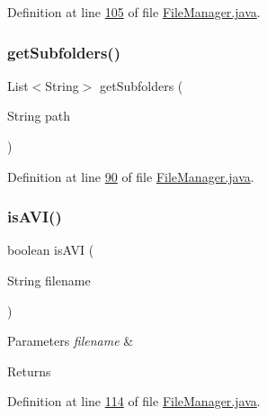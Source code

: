 Definition at line \hyperlink{_file_manager_8java_source_l00105}{105} of file \hyperlink{_file_manager_8java_source}{File\+Manager.\+java}.

\hypertarget{classfunctions_1_1_file_manager_a73efd872c86ccdce535ddb2798aaaea4}{}\label{classfunctions_1_1_file_manager_a73efd872c86ccdce535ddb2798aaaea4} 
\subsubsection{\texorpdfstring{get\+Subfolders()}{getSubfolders()}}
{\footnotesize\ttfamily List$<$String$>$ get\+Subfolders (\begin{DoxyParamCaption}\item[{String}]{path }\end{DoxyParamCaption})}



Definition at line \hyperlink{_file_manager_8java_source_l00090}{90} of file \hyperlink{_file_manager_8java_source}{File\+Manager.\+java}.

\hypertarget{classfunctions_1_1_file_manager_aef15c5bfadc70a7333a3103e85e7bf65}{}\label{classfunctions_1_1_file_manager_aef15c5bfadc70a7333a3103e85e7bf65} 
\subsubsection{\texorpdfstring{is\+A\+V\+I()}{isAVI()}}
{\footnotesize\ttfamily boolean is\+A\+VI (\begin{DoxyParamCaption}\item[{String}]{filename }\end{DoxyParamCaption})}


\begin{DoxyParams}{Parameters}
{\em filename} & \\
\hline
\end{DoxyParams}
\begin{DoxyReturn}{Returns}

\end{DoxyReturn}


Definition at line \hyperlink{_file_manager_8java_source_l00114}{114} of file \hyperlink{_file_manager_8java_source}{File\+Manager.\+java}.

